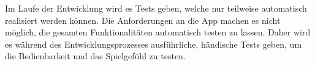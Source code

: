 Im Laufe der Entwicklung wird es Tests geben, welche nur teilweise automatisch realisiert werden können.
Die Anforderungen an die App machen es nicht möglich, die gesamten Funktionalitäten automatisch testen zu lassen.
Daher wird es während des Entwicklungsprozesses ausführliche, händische Tests geben, um die Bedienbarkeit und das Spielgefühl zu testen.
